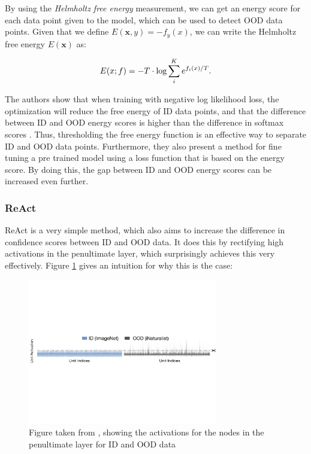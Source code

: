 \documentclass[UKenglish]{uiomasterthesis} %
\theoremstyle{definition}
\begin{document}
By using the {\it Helmholtz free energy} measurement, we can get an energy score for each data point given to the model, which can be used to detect OOD data points. Given that we define $E(\bm{x}, y) = -f_y(x)$, we can write the Helmholtz free energy $E(\bm{x})$ as:

\begin{equation}\label{eq:energy_softmax}
  E(\*x;f)=- T\cdot \text{log}\sum_i^K e^{f_i(\*x)/T}.
\end{equation}

The authors show that when training with negative log likelihood loss, the optimization will reduce the free energy of ID data points, and that the difference  between ID and OOD energy scores is higher than the difference in softmax scores \cite{energy}. Thus, thresholding the free energy function is an effective way to separate ID and OOD data points. Furthermore, they also present a method for fine tuning a pre trained model using a loss function that is based on the energy score. By doing this, the gap between ID and OOD energy scores can be increased even further.
\\

\subsubsection{ReAct}

ReAct \cite{react} is a very simple method, which also aims to increase the difference in confidence scores between ID and OOD data. It does this by rectifying high activations in the penultimate layer, which surprisingly achieves this very effectively. Figure \ref{react} gives an intuition for why this is the case:

\begin{figure}[h]
\centerline{\includegraphics[width=3.25in]{figure/react.pdf}}
\caption{Figure taken from \cite{react}, showing the activations for the nodes in the penultimate layer for ID and OOD data}
\label{react}
\end{figure}
\end{document}
